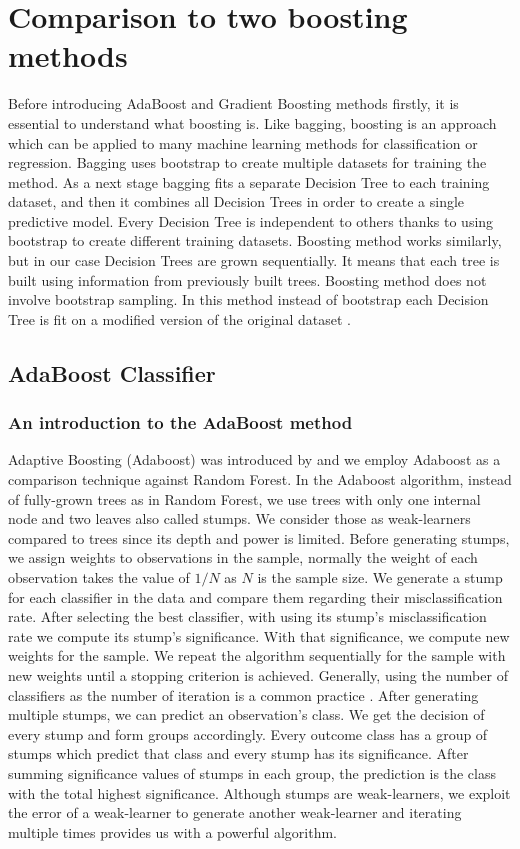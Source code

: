 \section{Comparison to two boosting methods}
Before introducing AdaBoost and Gradient Boosting methods firstly, 
it is essential to understand what boosting is. 
Like bagging, boosting is an approach which can be applied to many machine learning methods for 
classification or regression. Bagging uses bootstrap to create multiple datasets for training the method. 
As a next stage bagging fits a separate Decision Tree to each training dataset, 
and then it combines all Decision Trees in order to create a single predictive model. 
Every Decision Tree is independent to others thanks to using bootstrap to create different training datasets. 
Boosting method works similarly, but in our case Decision Trees are grown sequentially. 
It means that each tree is built using information from previously built trees. 
Boosting method does not involve bootstrap sampling. 
In this method instead of bootstrap each Decision Tree is fit on a modified version of 
the original dataset \cite{James2013}.

\subsection{AdaBoost Classifier}
\label{sec:adaboost}

\subsubsection{An introduction to the AdaBoost method}
Adaptive Boosting (Adaboost) was introduced by \cite{freund1997boosting} and we employ Adaboost as a comparison 
technique against Random Forest. In the Adaboost algorithm, instead of fully-grown trees as in Random Forest, 
we use trees with only one internal node and two leaves also called stumps. We consider those as weak-learners 
compared to trees since its depth and power is limited. Before generating stumps, 
we assign weights to observations in the sample, normally the weight of each observation takes the value 
of $1/N$ as $N$ is the sample size. We generate a stump for each classifier in the data and compare them regarding 
their misclassification rate. After selecting the best classifier, with using its stump's misclassification rate 
we compute its stump's significance. With that significance, we compute new weights for the sample. 
We repeat the algorithm sequentially for the sample with new weights until a stopping criterion is achieved. 
Generally, using the number of classifiers as the number of iteration is a common practice \cite{friedman2001elements}. 
After generating multiple stumps, we can predict an observation's class. 
We get the decision of every stump and form groups accordingly. 
Every outcome class has a group of stumps which predict that class and every stump has its significance. 
After summing significance values of stumps in each group, the prediction is the class with the total highest significance. 
Although stumps are weak-learners, we exploit the error of a weak-learner to generate another weak-learner 
and iterating multiple times provides us with a powerful algorithm.

